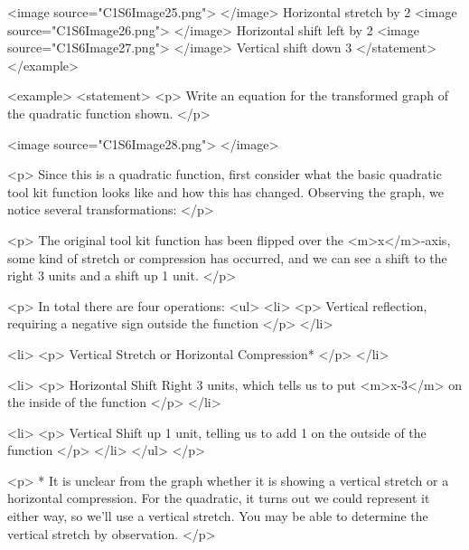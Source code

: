                 <image source="C1S6Image25.png">
                </image>
                Horizontal stretch by 2
                <image source="C1S6Image26.png">
                </image>
                Horizontal shift left by 2
                <image source="C1S6Image27.png">
                </image>
                Vertical shift down 3
            </statement>
        </example>

        <example>
            <statement>
                <p>
                    Write an equation for the transformed graph of the quadratic function shown.
                </p>

                <image source="C1S6Image28.png">
                </image>

                <p>
                    Since this is a quadratic function, first consider what the basic quadratic tool kit function looks like and how this has changed.
                    Observing the graph, we notice several transformations:
                </p>

                <p>
                    The original tool kit function has been flipped over the <m>x</m>-axis, some kind of stretch or compression has occurred, and we can see a shift to the right 3 units and a shift up 1 unit.
                </p>

                <p>
                    In total there are four operations:
                    <ul>
                        <li>
                            <p>
                                Vertical reflection, requiring a negative sign outside the function
                            </p>
                        </li>

                        <li>
                            <p>
                                Vertical Stretch or Horizontal Compression*
                            </p>
                        </li>

                        <li>
                            <p>
                                Horizontal Shift Right 3 units, which tells us to put <m>x-3</m> on the inside of the function
                            </p>
                        </li>

                        <li>
                            <p>
                                Vertical Shift up 1 unit, telling us to add 1 on the outside of the function
                            </p>
                        </li>
                    </ul>
                </p>

                <p>
                    * It is unclear from the graph whether it is showing a vertical stretch or a horizontal compression.
                    For the quadratic, it turns out we could represent it either way, so we’ll use a vertical stretch.
                    You may be able to determine the vertical stretch by observation.
                </p>

